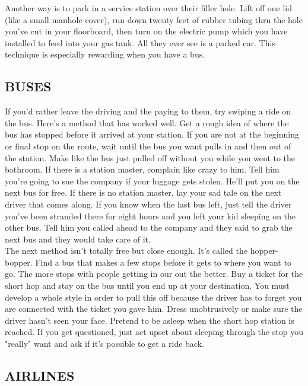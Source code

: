 \documentclass[11pt,twoside,a4paper]{book}
\begin{document}
Another way is to park in a service station over their filler hole. Lift off one lid (like a small manhole cover), run down twenty feet of rubber tubing thru the hole you've cut in your floorboard, then turn on the electric pump which you have installed to feed into your gas tank. All they ever see is a parked car. This technique is especially rewarding when you have a bus.~\\

\subsection{BUSES}

If you'd rather leave the driving and the paying to them, try swiping a ride on the bus. Here's a method that has worked well.  Get a rough idea of where the bus has stopped before it arrived at your station. If you are not at the beginning or final stop on the route, wait until the bus you want pulls in and then out of the station. Make like the bus just pulled off without you while you went to the bathroom. If there is a station master, complain like crazy to him. Tell him you're going to sue the company if your luggage gets stolen. He'll put you on the next bus for free. If there is no station master, lay your sad tale on the next driver that comes along. If you know when the last bus left, just tell the driver you've been stranded there for eight hours and you left your kid sleeping on the other bus. Tell him you called ahead to the company and they said to grab the next bus and they would take care of it.~\\

The next method isn't totally free but close enough. It's called the hopper-bopper. Find a bus that makes a few stops before it gets to where you want to go. The more stops with people getting in our out the better. Buy a ticket for the short hop and stay on the bus until you end up at your destination. You must develop a whole style in order to pull this off because the driver has to forget you are connected with the ticket you gave him. Dress unobtrusively or make sure the driver hasn't seen your face. Pretend to be asleep when the short hop station is reached. If you get questioned, just act upset about sleeping through the stop you "really" want and ask if it's possible to get a ride back.~\\
	
\subsection{AIRLINES}
\end{document}
